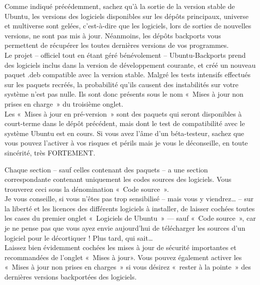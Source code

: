 {\begin{itemize}
\end{itemize}
Comme indiqué précédemment, sachez qu'à la sortie de la version stable de Ubuntu, les versions des logiciels disponibles sur les dépôts principaux, universe et multiverse sont gelées, c'est-à-dire que les logiciels, lors de sorties de nouvelles versions, ne sont pas mis à jour. Néanmoins, les dépôts backports vous permettent de récupérer les toutes dernières versions de vos programmes.\\
Le projet -- officiel tout en étant géré bénévolement -- Ubuntu-Backports prend des logiciels inclus dans la version de développement courante, et créé un nouveau paquet .deb compatible avec la version stable. Malgré les tests intensifs effectués sur les paquets recréés, la probabilité qu'ils causent des instabilités sur votre système n'est pas nulle. Ils sont donc présents sous le nom «~Mises à jour non prises en charge~» du troisième onglet.\\
Les «~Mises à jour en pré-version~» sont des paquets qui seront disponibles à court-terme dans le dépôt précédent, mais dont le test de compatibilité avec le système Ubuntu est en cours. Si vous avez l'âme d'un béta-testeur, sachez que vous pouvez l'activer à vos risques et périls mais je vous le déconseille, en toute sincérité, très FORTEMENT.\par
Chaque section -- sauf celles contenant des paquets  -- a une section correspondante contenant uniquement les codes sources des logiciels. Vous trouverez ceci sous la dénomination «~Code source~».\\
Je vous conseille, si vous n'êtes pas trop sensibilisé -- mais vous y viendrez\ldots{} -- sur la liberté et les licences des différents logiciels à installer, de laisser cochées toutes les cases du premier onglet «~Logiciels de Ubuntu~» --- sauf «~Code source~», car je ne pense pas que vous ayez envie aujourd'hui de télécharger les sources d'un logiciel pour le décortiquer ! Plus tard, qui sait\ldots{}\\
Laissez bien évidemment cochées les mises à jour de sécurité importantes et recommandées de l'onglet «~Mises à jour». Vous pouvez également activer les «~Mises à jour non prises en charges~» si vous désirez «~rester à la pointe~» des dernières versions backportées des logiciels.
}
